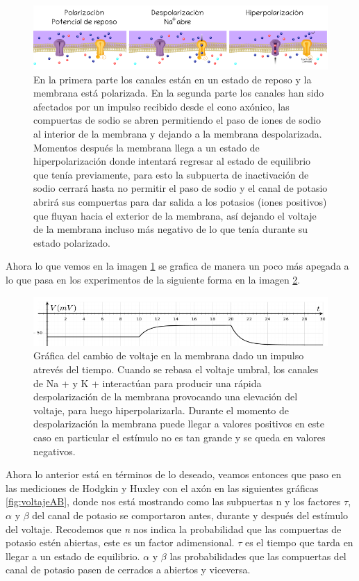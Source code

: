 \begin{figure}[h]
 \centering
 \includegraphics[scale=0.5]{../Figuras/polarizacion1.png}
 \caption{En la primera parte los canales están en un estado de reposo y la membrana está polarizada. En la segunda parte los canales han sido afectados por un impulso recibido desde el cono axónico, las compuertas de sodio se abren permitiendo el paso de iones de sodio al interior de la membrana y dejando a la membrana despolarizada. Momentos después la membrana llega a un estado de hiperpolarización donde intentará regresar al estado de equilibrio que tenía previamente, para esto la subpuerta de inactivación de sodio cerrará hasta no permitir el paso de sodio y el canal de potasio abrirá sus compuertas para dar salida a los potasios (iones positivos) que fluyan hacia el exterior de la membrana, así dejando el voltaje de la membrana incluso más negativo de lo que tenía durante su estado polarizado. }
 \label{fig:voltaje1}
\end{figure}

Ahora lo que vemos en la imagen \ref{fig:voltaje1} se grafica de manera un poco más apegada a lo que pasa en los experimentos de la siguiente forma en la imagen \ref{fig:voltaje2}.

\begin{figure}[h]
 \centering
 \includegraphics[scale=0.5]{../Figuras/polarizacion2.png}
 \caption{Gráfica del cambio de voltaje en la membrana dado un impulso atrevés del tiempo. Cuando se rebasa el voltaje umbral, los canales de Na + y K + interactúan para producir una rápida despolarización de la membrana provocando una elevación del voltaje, para luego hiperpolarizarla. Durante el momento de despolarización la membrana puede llegar a valores positivos en este caso en particular el estímulo no es tan grande y se queda en valores negativos.}
 \label{fig:voltaje2}
\end{figure}


Ahora lo anterior está en términos de lo deseado, veamos entonces que paso en las mediciones de Hodgkin y Huxley con el axón en las siguientes gráficas \ref{fig:voltajeAB}, donde nos está mostrando como las subpuertas n y los factores \(\tau\), \(\alpha\) y \(\beta\) del canal de potasio se comportaron antes, durante y después del estímulo del voltaje. Recodemos que \emph{n} nos indica la probabilidad que las compuertas de potasio estén abiertas, este es un factor adimensional. \(\tau\) es el tiempo que tarda en llegar a un estado de equilibrio. \(\alpha\) y \(\beta\) las probabilidades que las compuertas del canal de potasio pasen de cerrados a abiertos y viceversa. 



